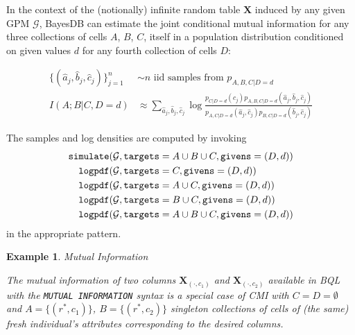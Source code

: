 \documentclass[10pt,letterpaper]{article}
\newtheorem{example}{Example}[section]
\newcommand{\set}[1]{\{#1\}}
\newcommand{\G}{\mathcal{G}}
\begin{document}
In the context of the (notionally) infinite random table $\mathbf{X}$
induced by any given GPM $\G$,
BayesDB can estimate the joint conditional mutual information for any
three collections of cells $A$, $B$, $C$, itself in a population distribution
conditioned on given values $d$ for any fourth collection of cells $D$:

    \begin{align*}
    \set{(\hat{a}_j,\hat{b}_j,\hat{c}_j)}_{j=1}^n & \sim n \textrm{ iid samples from } p_{A,B,C|D=d} \\
    I(A;B|C,D=d) & \approx
        \sum_{\hat{a}_j,\hat{b}_j,\hat{c}_j} \log
         \frac{p_{C|D=d}(\hat{c}_j)
         p_{A,B,C|D=d}(\hat{a}_j,\hat{b}_j,\hat{c}_j)}
         {p_{A,C|D=d}(\hat{a}_j,\hat{c}_j) p_{B,C|D=d}(\hat{b}_j,\hat{c}_j)}
    \end{align*}

    The samples and log densities are computed by invoking
    \begin{align*}
    {\tt simulate}&(\G, {\tt targets} = A \cup B \cup C, {\tt givens} = (D, d)) \\
    {\tt logpdf}&(\G, {\tt targets} = C, {\tt givens} = (D, d)) \\
    {\tt logpdf}&(\G, {\tt targets} = A \cup C, {\tt givens} = (D, d)) \\
    {\tt logpdf}&(\G, {\tt targets} = B \cup C, {\tt givens} = (D, d)) \\
    {\tt logpdf}&(\G, {\tt targets} = A \cup B \cup C, {\tt givens} = (D, d))
    \end{align*}
    in the appropriate pattern.


\begin{example} Mutual Information

The mutual information of two columns $\mathbf{X}_{(\cdot,c_1)}$ and 
$\mathbf{X}_{(\cdot,c_2)}$
available in BQL with the \texttt{MUTUAL INFORMATION} syntax is a special case 
of CMI with $C = D = \emptyset$ and $A = \set{(r^*, c_1)}$, $B = \set{(r^*, 
c_2)}$ singleton collections of cells of (the same) fresh individual's
attributes corresponding to the desired columns.
\end{example}
\end{document}
